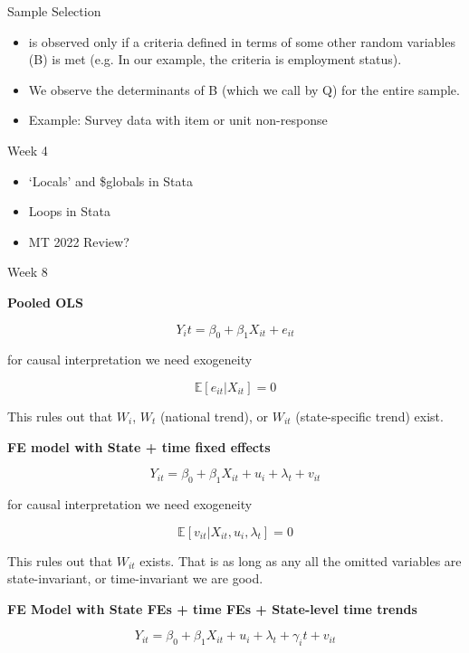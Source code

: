 \documentclass{beamer}
\begin{document}
\begin{frame}{Sample Selection}
\begin{itemize}
\item is observed only if a criteria defined in terms of some other random
 variables (B) is met (e.g. In our example, the criteria is employment status).
\item We observe the determinants of B (which we call by Q) for the entire 
sample.
\item Example: Survey data with item or unit non-response
\end{itemize}
\end{frame}


\begin{frame}{Week 4}
\begin{itemize}
\item `Locals' and \$globals in Stata
\item Loops in Stata
\item MT 2022 Review?
\end{itemize}
\end{frame}

\begin{frame}{Week 8}


\textbf{Pooled OLS}

$$
Y_it = \beta_0 + \beta_1 X_{it} + e_{it}
$$

for causal interpretation we need exogeneity

$$
\mathbb{E}[e_{it}|X_{it}]=0
$$

This rules out that $W_i$, $W_t$ (national trend), or $W_{it}$ (state-specific
trend) exist.

\textbf{FE model with State + time fixed effects}

$$
Y_{it} = \beta_0 + \beta_1 X_{it} + u_i + \lambda_t + v_{it}
$$

for causal interpretation we need exogeneity

$$
\mathbb{E}[v_{it}|X_{it}, u_i, \lambda_t ]=0
$$

This rules out that $W_{it}$ exists. That is as long as any all the omitted 
variables are state-invariant, or time-invariant we are good. 


\textbf{FE Model with State FEs + time FEs + State-level time trends}

$$
Y_{it} = \beta_0 + \beta_1 X_{it} + u_i + \lambda_t + \gamma_i t + v_{it}
$$


\end{frame}
\end{document}
